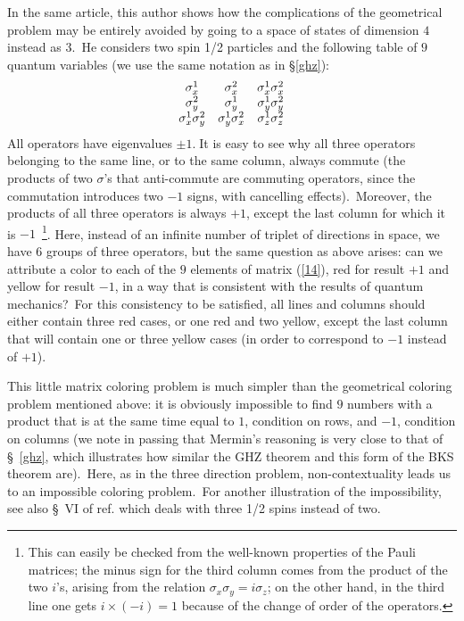 \documentclass[12pt,onecolumn]{article}%
\begin{document}
In the same article, this author shows how the complications of the
geometrical problem may be entirely avoided by going to a space of states of
dimension $4$ instead as $3$.\ He considers two spin 1/2 particles and the
following table of $9$ quantum variables (we use the same notation as in
\S \ref{ghz}):%
\begin{equation}%
\begin{array}
[c]{ccc}%
\sigma_{x}^{1} & \sigma_{x}^{2} & \sigma_{x}^{1}\sigma_{x}^{2}\\
\sigma_{y}^{2} & \sigma_{y}^{1} & \sigma_{y}^{1}\sigma_{y}^{2}\\
\sigma_{x}^{1}\sigma_{y}^{2} & \sigma_{y}^{1}\sigma_{x}^{2} & \sigma_{z}%
^{1}\sigma_{z}^{2}%
\end{array}
\label{14}%
\end{equation}
All operators have eigenvalues $\pm1$.$\;$It is easy to see why all three
operators belonging to the same line, or to the same column, always commute
(the products of two $\sigma$'s that anti-commute are commuting operators,
since the commutation introduces two $-1$ signs, with cancelling
effects).\ Moreover, the products of all three operators is always $+1$,
except the last column for which it is $-1$\ \footnote{This can easily be
checked from the well-known properties of the Pauli matrices; the minus sign
for the third column comes from the product of the two $i$'s, arising from the
relation $\sigma_{x}\sigma_{y}=i\sigma_{z}$; on the other hand, in the third
line one gets $i\times(-i)=1$ because of the change of order of the
operators.}. Here, instead of an infinite number of triplet of directions in
space, we have $6$ groups of three operators, but the same question as above
arises: can we attribute a color to each of the $9$ elements of matrix
(\ref{14}), red for result $+1$ and yellow for result $-1$, in a way that is
consistent with the results of quantum mechanics?\ For this consistency to be
satisfied, all lines and columns should either contain three red cases, or one
red and two yellow, except the last column that will contain one or three
yellow cases (in order to correspond to $-1$ instead of $+1$).

This little matrix coloring problem is much simpler than the geometrical
coloring problem mentioned above: it is obviously impossible to find $9$
numbers with a product that is at the same time equal to $1$, condition on
rows, and $-1$, condition on columns (we note in passing that Mermin's
reasoning is very close to that of \S \ \ref{ghz}, which illustrates how
similar the GHZ theorem and this form of the BKS theorem are).\ Here, as in
the three direction problem, non-contextuality leads us to an impossible
coloring problem.\ For another illustration of the impossibility, see also
\S \ VI of ref. \cite{Mermin} which deals with three 1/2 spins instead of two.
\end{document}
